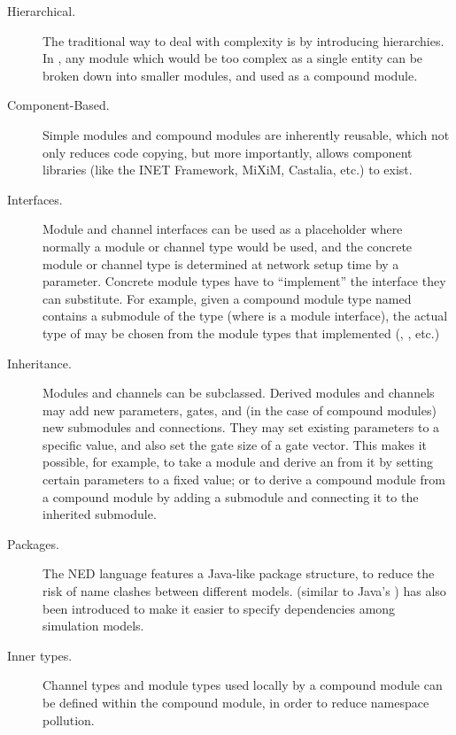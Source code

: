 \begin{description}

\item[Hierarchical.] The traditional way to deal with complexity is by
introducing hierarchies. In {\opp}, any module which would be too complex as
a single entity can be broken down into smaller modules, and used as a
compound module.

\item[Component-Based.] Simple modules and compound modules are inherently
reusable, which not only reduces code copying, but more importantly, allows
component libraries (like the INET Framework, MiXiM, Castalia, etc.) to
exist.

\item[Interfaces.] Module and channel interfaces can be used as a
placeholder where normally a module or channel type would be used, and the
concrete module or channel type is determined at network setup time by a
parameter. Concrete module types have to ``implement'' the interface they
can substitute. For example, given a compound module type named
 contains a  submodule of the type
 (where  is a module interface), the actual
type of  may be chosen from the module types that implemented
 (, , etc.)

\item[Inheritance.] Modules and channels can be subclassed. Derived modules
and channels may add new parameters, gates, and (in the case of compound
modules) new submodules and connections. They may set existing parameters
to a specific value, and also set the gate size of a gate vector. This
makes it possible, for example, to take a  module
and derive an  from it by setting certain parameters to a fixed
value; or to derive a  compound module from a
 compound module by adding a  submodule and
connecting it to the inherited  submodule.

\item[Packages.] The NED language features a Java-like package structure,
to reduce the risk of name clashes between different models. 
(similar to Java's ) has also been introduced to make it easier
to specify dependencies among simulation models.

\item[Inner types.] Channel types and module types used locally by a
compound module can be defined within the compound module, in order to
reduce namespace pollution.


\end{description}

